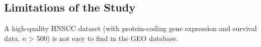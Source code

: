 \documentclass[
paper=landscape,
paper=160mm:90mm, %
fontsize=11pt, %
pagesize, %
parskip=half-, %
]{scrartcl} %
\theoremstyle{mythmstyle} %
\begin{document}








\subsection{Limitations of the Study}
A high-quality HNSCC dataset (with protein-coding gene expression and survival data, $n$ > 500) is not easy to find in the GEO database.


%
\thispagestyle{headings}
\end{document}
